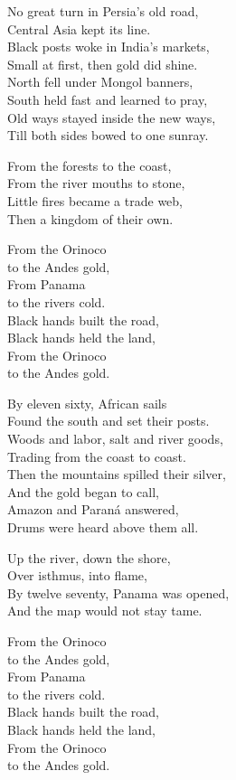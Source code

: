 \begin{lyrics}
No great turn in Persia’s old road,\\
Central Asia kept its line.\\
Black posts woke in India’s markets,\\
Small at first, then gold did shine.\\
North fell under Mongol banners,\\
South held fast and learned to pray,\\
Old ways stayed inside the new ways,\\
Till both sides bowed to one sunray.

From the forests to the coast,\\
From the river mouths to stone,\\
Little fires became a trade web,\\
Then a kingdom of their own.

From the Orinoco\\
to the Andes gold,\\
From Panama\\
to the rivers cold.\\
Black hands built the road,\\
Black hands held the land,\\
From the Orinoco\\
to the Andes gold.

By eleven sixty, African sails\\
Found the south and set their posts.\\
Woods and labor, salt and river goods,\\
Trading from the coast to coast.\\
Then the mountains spilled their silver,\\
And the gold began to call,\\
Amazon and Paraná answered,\\
Drums were heard above them all.

Up the river, down the shore,\\
Over isthmus, into flame,\\
By twelve seventy, Panama was opened,\\
And the map would not stay tame.

From the Orinoco\\
to the Andes gold,\\
From Panama\\
to the rivers cold.\\
Black hands built the road,\\
Black hands held the land,\\
From the Orinoco\\
to the Andes gold.


\end{lyrics}
